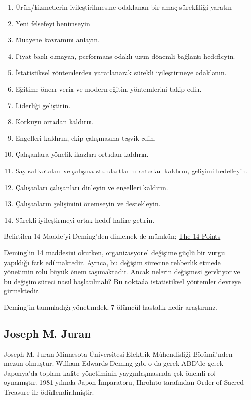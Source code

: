 \documentclass[
]{book}
\begin{document}
\begin{enumerate}
\def\labelenumi{\arabic{enumi}.}
\item
  Ürün/hizmetlerin iyileştirilmesine odaklanan bir amaç sürekliliği yaratın
\item
  Yeni felsefeyi benimseyin
\item
  Muayene kavramını anlayın.
\item
  Fiyat bazlı olmayan, performans odaklı uzun dönemli bağlantı hedefleyin.
\item
  İstatistiksel yöntemlerden yararlanarak sürekli iyileştirmeye odaklanın.
\item
  Eğitime önem verin ve modern eğitim yöntemlerini takip edin.
\item
  Liderliği geliştirin.
\item
  Korkuyu ortadan kaldırın.
\item
  Engelleri kaldırın, ekip çalışmasına teşvik edin.
\item
  Çalışanlara yönelik ikazları ortadan kaldırın.
\item
  Sayısal kotaları ve çalışma standartlarını ortadan kaldırın, gelişimi hedefleyin.
\item
  Çalışanları çalışanları dinleyin ve engelleri kaldırın.
\item
  Çalışanların gelişimini önemseyin ve destekleyin.
\item
  Sürekli iyileştirmeyi ortak hedef haline getirin.
\end{enumerate}

Belirtilen 14 Madde'yi Deming'den dinlemek de mümkün; \href{https://www.youtube.com/watch?v=tsF-8u-V4j4}{The 14 Points}

Deming'in 14 maddesini okurken, organizasyonel değişime güçlü bir vurgu yapıldığı fark edilmaktedir. Ayrıca, bu değişim sürecine rehberlik etmede yönetimin rolü büyük önem taşımaktadır. Ancak nelerin değişmesi gerekiyor ve bu değişim süreci nasıl başlatılmalı? Bu noktada istatistiksel yöntemler devreye girmektedir.

{Deming'in tanımladığı yönetimdeki 7 ölümcül hastalık nedir araştırınız.}

\hypertarget{joseph-m.-juran}{%
\subsection{Joseph M. Juran}\label{joseph-m.-juran}}

Joseph M. Juran Minnesota Üniversitesi Elektrik Mühendisliği Bölümü'nden mezun olmuştur. William Edwards Deming gibi o da gerek ABD'de gerek Japonya'da toplam kalite yönetiminin yaygınlaşmasında çok önemli rol oynamıştır. 1981 yılında Japon İmparatoru, Hirohito tarafından Order of Sacred Treasure ile ödüllendirilmiştir.
\end{document}
